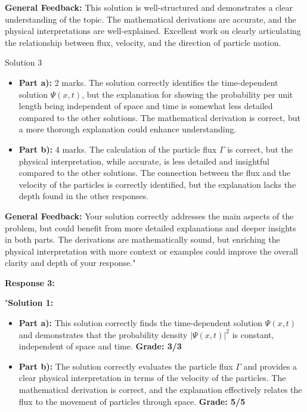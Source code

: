 \documentclass[a4paper,11pt]{article}
\begin{document}
\textbf{General Feedback:} This solution is well-structured and demonstrates a clear understanding of the topic. The mathematical derivations are accurate, and the physical interpretations are well-explained. Excellent work on clearly articulating the relationship between flux, velocity, and the direction of particle motion.

Solution 3
\begin{itemize}
    \item \textbf{Part a):} 2 marks. The solution correctly identifies the time-dependent solution \(\Psi(x,t)\), but the explanation for showing the probability per unit length being independent of space and time is somewhat less detailed compared to the other solutions. The mathematical derivation is correct, but a more thorough explanation could enhance understanding.
    \item \textbf{Part b):} 4 marks. The calculation of the particle flux \(\Gamma\) is correct, but the physical interpretation, while accurate, is less detailed and insightful compared to the other solutions. The connection between the flux and the velocity of the particles is correctly identified, but the explanation lacks the depth found in the other responses.
\end{itemize}

\textbf{General Feedback:} Your solution correctly addresses the main aspects of the problem, but could benefit from more detailed explanations and deeper insights in both parts. The derivations are mathematically sound, but enriching the physical interpretation with more context or examples could improve the overall clarity and depth of your response."

\textbf{Response 3:}

"\textbf{Solution 1:}

\begin{itemize}
    \item \textbf{Part a):} This solution correctly finds the time-dependent solution $\Psi(x,t)$ and demonstrates that the probability density $|\Psi(x,t)|^2$ is constant, independent of space and time. \textbf{Grade: 3/3}
    \item \textbf{Part b):} The solution correctly evaluates the particle flux $\Gamma$ and provides a clear physical interpretation in terms of the velocity of the particles. The mathematical derivation is correct, and the explanation effectively relates the flux to the movement of particles through space. \textbf{Grade: 5/5}
\end{itemize}
\end{document}
